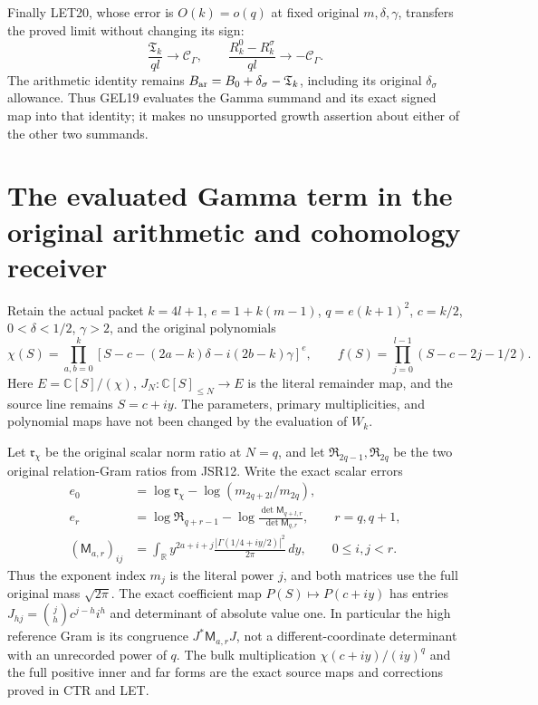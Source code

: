 \documentclass[11pt,a4paper]{article}
\begin{document}
Finally LET20, whose error is \(O(k)=o(q)\) at fixed original
\(m,\delta,\gamma\), transfers the proved limit without changing its sign:
\[
 \frac{\mathfrak T_k}{ql}\longrightarrow\mathcal C_\Gamma,
 \qquad
 \frac{R_k^0-R_k^\sigma}{ql}\longrightarrow-\mathcal C_\Gamma.
 \tag{GEL19}
\]
The arithmetic identity remains
\(B_{\rm ar}=B_0+\delta_\sigma-\mathfrak T_k\), including its original
\(\delta_\sigma\) allowance. Thus GEL19 evaluates the Gamma summand
and its exact signed map into that identity; it makes no unsupported
growth assertion about either of the other two summands.


\clearpage

\section{The evaluated Gamma term in the original arithmetic and cohomology receiver}
\label{sec:WGR}

Retain the actual packet $k=4l+1$, $e=1+k(m-1)$,
$q=e(k+1)^2$, $c=k/2$, $0<\delta<1/2$, $\gamma>2$,
and the original polynomials
\[
 \chi(S)=\prod_{a,b=0}^k
 [S-c-(2a-k)\delta-i(2b-k)\gamma]^e,\qquad
 f(S)=\prod_{j=0}^{l-1}(S-c-2j-1/2).
 \tag{WGR1}
\]
Here $E=\mathbb C[S]/(\chi)$, $J_N:\mathbb C[S]_{\le N}\to E$
is the literal remainder map, and the source line remains $S=c+iy$.
The parameters, primary multiplicities, and polynomial maps have not
been changed by the evaluation of $W_k$.

Let $\mathfrak r_\chi$ be the original scalar norm ratio at $N=q$,
and let $\mathfrak R_{2q-1},\mathfrak R_{2q}$ be the two original
relation-Gram ratios from JSR12. Write the exact scalar errors
\[
 \begin{aligned}
 e_0&=\log\mathfrak r_\chi-\log(m_{2q+2l}/m_{2q}),\\
 e_r&=\log\mathfrak R_{q+r-1}
       -\log\frac{\det\mathsf M_{q+l,r}}{\det\mathsf M_{q,r}},
       \qquad r=q,q+1,\\
 (\mathsf M_{a,r})_{ij}&=\int_{\mathbb R}y^{2a+i+j}
            \frac{|\Gamma(1/4+iy/2)|^2}{2\pi}\,dy,
            \qquad 0\le i,j<r .
 \end{aligned}\tag{WGR2}
\]
Thus the exponent index $m_j$ is the literal power $j$, and both
matrices use the full original mass $\sqrt{2\pi}$.
The exact coefficient map $P(S)\mapsto P(c+iy)$ has entries
$J_{hj}=\binom jh c^{j-h}i^h$ and determinant of absolute value one.
In particular the high reference Gram is its congruence
$J^*\mathsf M_{a,r}J$, not a different-coordinate determinant with
an unrecorded power of $q$. The bulk multiplication
$\chi(c+iy)/(iy)^q$ and the full positive inner and far forms are
the exact source maps and corrections proved in CTR and LET.
\end{document}
